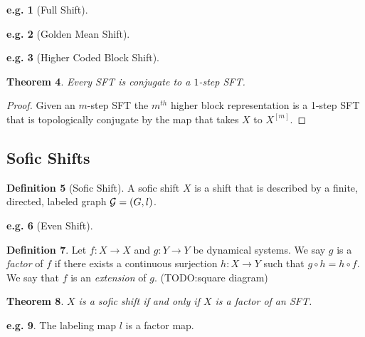 \documentclass[11pt, reqno]{amsart}
\theoremstyle{plain}
\newtheorem{thm}{Theorem}[section]
\numberwithin{thm}{subsection}
\theoremstyle{definition}
\newtheorem{defn}[thm]{Definition}
\newtheorem{example}[thm]{e.g.}
\begin{document}
\begin{example}[Full Shift]
  
\end{example}

\begin{example}[Golden Mean Shift]
  
\end{example}

\begin{example}[Higher Coded Block Shift]
  
\end{example}

\begin{thm}\cite[L.2]{wolf}
  Every SFT is conjugate to a $1$-step SFT.
\end{thm}

\begin{proof}
  Given an $m$-step SFT the $m^{th}$ higher block representation is a 1-step SFT that is topologically conjugate by the map that takes $X$ to $X^{[m]}$.
\end{proof}

\subsection{Sofic Shifts}
\begin{defn}[Sofic Shift]\cite[L.3]{wolf}
  A sofic shift $X$ is a shift that is described by a finite, directed, labeled graph $\mathcal{G} = (G, l)$. 
\end{defn}

\begin{example}[Even Shift]
  
\end{example}

\begin{defn}
  Let $f: X \rightarrow X$ and $g: Y \rightarrow Y$ be dynamical systems. We say $g$ is a \textit{factor} of $f$ if there exists a continuous surjection $h: X \rightarrow Y$ such that $g \circ h = h \circ f$. We say that $f$ is an \textit{extension} of $g$. (TODO:square diagram)
\end{defn}

\begin{thm}\cite[L.4]{wolf}
  $X$ is a sofic shift if and only if $X$ is a factor of an SFT.
\end{thm}

\begin{example}
  The labeling map $l$ is a factor map.
\end{example}
\end{document}
